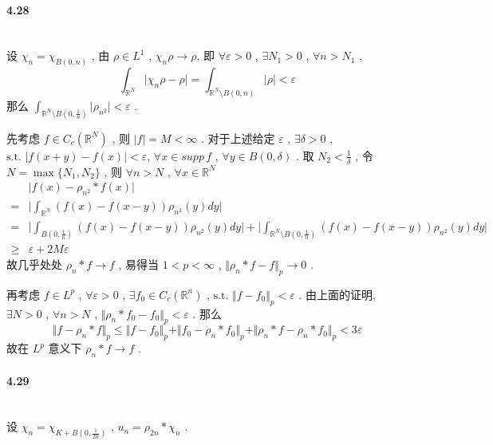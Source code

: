 \documentclass[a4paper, UTF8]{ctexart}				%
\numberwithin{equation}{section}				%
\begin{document}
	\paragraph{4.28}\quad\\
	\indent 设 $\chi_n = \chi_{B(0, n)}$ ,
	由 $\rho \in L^1$ , $\chi_n \rho \rightarrow \rho$,
	即 $\forall \varepsilon > 0$ , $\exists N_1 > 0$ , $\forall n > N_1$ , 
	\[
		\int^{ }_{\mathbb{R}^N} \vert{\chi_n \rho - \rho}\vert = \int^{ }_{\mathbb{R}^N \setminus B(0, n)} \vert{\rho}\vert < \varepsilon
	\]
	那么 $\int^{ }_{\mathbb{R}^N \setminus B(0, \frac{1}{n})} \vert{\rho_{n^2}}\vert < \varepsilon$ .
	
	先考虑 $f \in C_c(\mathbb{R}^N)$ , 则 $\vert{f}\vert = M < \infty$ .
	对于上述给定 $\varepsilon$ , $\exists \delta > 0$ ,
	$\text{s.t. } \vert{f(x + y) - f(x)}\vert < \varepsilon$,
	$\forall x \in supp\,f$ , $\forall y \in B(0, \delta)$ .
	取 $N_2 < \frac{1}{\delta}$ , 令 $N = \max \{N_1, N_2\}$ ,
	则 $\forall n > N$ , $\forall x \in \mathbb{R}^N$
	\begin{equation}
		\begin{split}
				& \vert{f(x) - \rho_{n^2}*f(x)}\vert\\
			=	& \Big\vert \int^{ }_{\mathbb{R}^N} (f(x) - f(x - y)) \rho_{n^2}(y) dy \Big\vert\\
			=	& \Big\vert \int^{ }_{B(0, \frac{1}{n})} (f(x) - f(x - y)) \rho_{n^2}(y) dy \Big\vert + \Big\vert \int^{ }_{\mathbb{R}^N \setminus B(0, \frac{1}{n})} (f(x) - f(x - y)) \rho_{n^2}(y) dy \Big\vert\\
			\ge	& \varepsilon + 2M \varepsilon
		\end{split}
	\end{equation}
	故几乎处处 $\rho_{n}*f \rightarrow f$ , 易得当 $1 < p < \infty$ ,
	$\Vert{\rho_{n}*f - f}\Vert_p \rightarrow 0$ .

	再考虑 $f \in L^p$ ,
	$\forall \varepsilon > 0$ ,
	$\exists f_0 \in C_c(\mathbb{R}^n)$ ,
	$\text{s.t. } \Vert{f - f_0}\Vert_p < \varepsilon$ .
	由上面的证明, $\exists N > 0$ , $\forall n > N$ ,
	$\Vert{\rho_{n}*f_0 - f_0}\Vert_p < \varepsilon$ .
	那么 
	\[
		\Vert{f - \rho_{n}*f}\Vert_p \le \Vert{f - f_0}\Vert_p + \Vert{f_0 - \rho_{n}*f_0}\Vert_p + \Vert{\rho_{n}*f - \rho_{n}*f_0}\Vert_p < 3 \varepsilon
	\]
	故在 $L^p$ 意义下 $\rho_{n}*f \rightarrow f$ .\\

	\paragraph{4.29}\quad\\
	\indent 设 $\chi_n = \chi_{K + B(0, \frac{1}{2n})}$ , $u_n = \rho_{2n} * \chi_n$ . 
	
\end{document}
